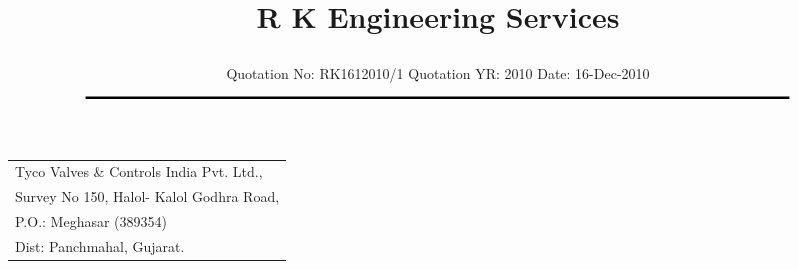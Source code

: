 \documentclass[11pt]{article}
\title{\vspace*{-1.5cm} \centerline{ \Huge \bf \hspace{0cm} R K Engineering Services}\vspace*{-0.75cm}}
\author{%
 \scriptsize Quotation No: RK1612010/1  \hspace*{4cm}  Quotation YR: 2010 \hspace*{4cm} Date: 16-Dec-2010\\
$\rule{7.0in}{0.5mm}$}
\date{}
\begin{document}
\maketitle
\thispagestyle{empty}
\vspace*{0.5cm}	
\begin{flushleft}
{\footnotesize
\begin{tabular}{l}
Tyco Valves \& Controls India Pvt. Ltd.,\\
Survey No 150, Halol- Kalol Godhra Road,\\
P.O.:  Meghasar (389354)\\
Dist: Panchmahal, Gujarat.\\
\end{tabular}
}
\end{flushleft}

\vspace*{0cm}

\vspace*{0.5cm}

\end{document}
